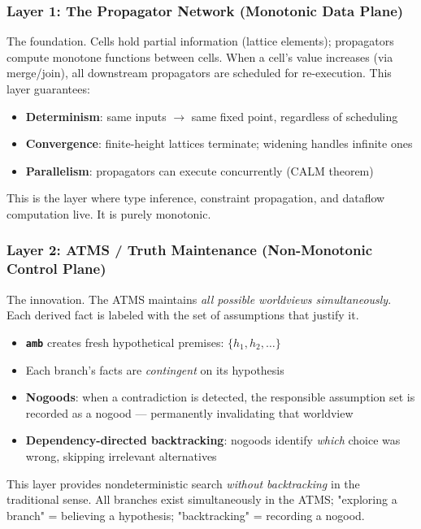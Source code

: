 \documentclass[11pt]{article}
\begin{document}
\subsubsection{Layer 1: The Propagator Network (Monotonic Data Plane)}
\label{sec:org1455ada}

The foundation. Cells hold partial information (lattice elements);
propagators compute monotone functions between cells. When a cell's
value increases (via merge/join), all downstream propagators are
scheduled for re-execution. This layer guarantees:

\begin{itemize}
\item \textbf{Determinism}: same inputs \(\to\) same fixed point, regardless of scheduling
\item \textbf{Convergence}: finite-height lattices terminate; widening handles infinite ones
\item \textbf{Parallelism}: propagators can execute concurrently (CALM theorem)
\end{itemize}

This is the layer where type inference, constraint propagation, and
dataflow computation live. It is purely monotonic.
\subsubsection{Layer 2: ATMS / Truth Maintenance (Non-Monotonic Control Plane)}
\label{sec:orge4e0eff}

The innovation. The ATMS maintains \emph{all possible worldviews simultaneously}.
Each derived fact is labeled with the set of assumptions that justify it.

\begin{itemize}
\item \textbf{\texttt{amb}} creates fresh hypothetical premises: \(\{h_1, h_2, \ldots\}\)
\item Each branch's facts are \emph{contingent} on its hypothesis
\item \textbf{Nogoods}: when a contradiction is detected, the responsible assumption set
is recorded as a nogood --- permanently invalidating that worldview
\item \textbf{Dependency-directed backtracking}: nogoods identify \emph{which} choice was
wrong, skipping irrelevant alternatives
\end{itemize}

This layer provides nondeterministic search \emph{without backtracking} in the
traditional sense. All branches exist simultaneously in the ATMS; "exploring
a branch" = believing a hypothesis; "backtracking" = recording a nogood.
\end{document}
